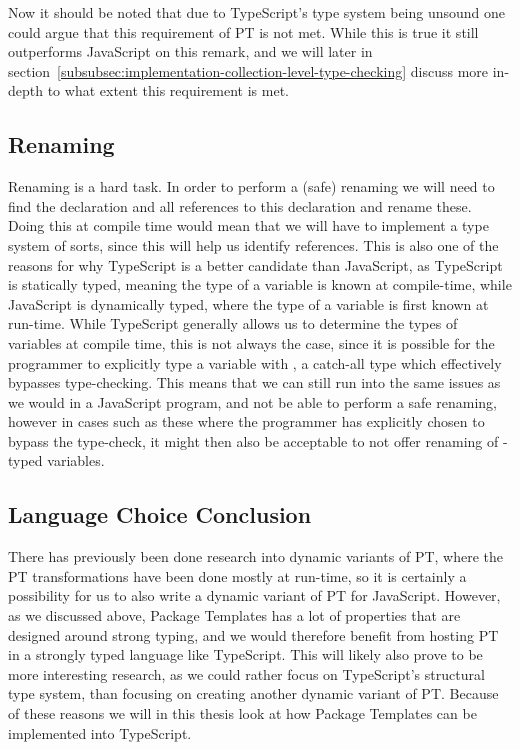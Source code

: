 Now it should be noted that due to TypeScript's type system being unsound one could argue that this requirement of PT is not met.
While this is true it still outperforms JavaScript on this remark, and we will later in section~\vref{subsubsec:implementation-collection-level-type-checking} discuss more in-depth to what extent this requirement is met.

\subsection{Renaming}\label{subsec:ts-vs-js-renaming}

Renaming is a hard task.
In order to perform a (safe) renaming we will need to find the declaration and all references to this declaration and rename these.
Doing this at compile time would mean that we will have to implement a type system of sorts, since this will help us identify references.
This is also one of the reasons for why TypeScript is a better candidate than JavaScript, as TypeScript is statically typed, meaning the type of a variable is known at compile-time, while JavaScript is dynamically typed, where the type of a variable is first known at run-time.
While TypeScript generally allows us to determine the types of variables at compile time, this is not always the case, since it is possible for the programmer to explicitly type a variable with , a catch-all type which effectively bypasses type-checking.
This means that we can still run into the same issues as we would in a JavaScript program, and not be able to perform a safe renaming, however in cases such as these where the programmer has explicitly chosen to bypass the type-check, it might then also be acceptable to not offer renaming of -typed variables.

\subsection{Language Choice Conclusion}\label{subsec:langauge-choice-conclusion}

There has previously been done research into dynamic variants of PT, where the PT transformations have been done mostly at run-time, so it is certainly a possibility for us to also write a dynamic variant of PT for JavaScript.
However, as we discussed above, Package Templates has a lot of properties that are designed around strong typing, and we would therefore benefit from hosting PT in a strongly typed language like TypeScript.
This will likely also prove to be more interesting research, as we could rather focus on TypeScript's structural type system, than focusing on creating another dynamic variant of PT\@.
Because of these reasons we will in this thesis look at how Package Templates can be implemented into TypeScript.

